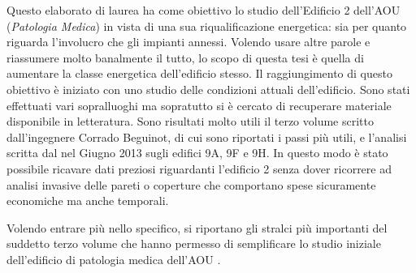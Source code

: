 Questo elaborato di laurea ha come obiettivo lo studio dell'Edificio 2 dell'AOU \uni{} (\emph{Patologia Medica}) in vista di una sua riqualificazione energetica: sia per quanto riguarda l'involucro che gli impianti annessi. Volendo usare altre parole e riassumere molto banalmente il tutto, lo scopo di questa tesi è quella di aumentare la classe energetica dell'edificio stesso. Il raggiungimento di questo obiettivo è iniziato con uno studio delle condizioni attuali dell'edificio. Sono stati effettuati vari sopralluoghi ma sopratutto si è cercato di recuperare materiale disponibile in letteratura. Sono risultati molto utili il terzo volume scritto dall'ingegnere Corrado Beguinot, di cui sono riportati i passi più utili, e l'analisi scritta dal  nel Giugno 2013 sugli edifici 9A, 9F e 9H. In questo modo è stato possibile ricavare dati preziosi riguardanti l'edificio 2 senza dover ricorrere ad analisi invasive delle pareti o coperture che comportano spese sicuramente economiche ma anche temporali.

Volendo entrare più nello specifico, si riportano gli stralci più importanti del suddetto terzo volume che hanno permesso di semplificare lo studio iniziale dell'edificio di patologia medica dell'AOU \uni. 

